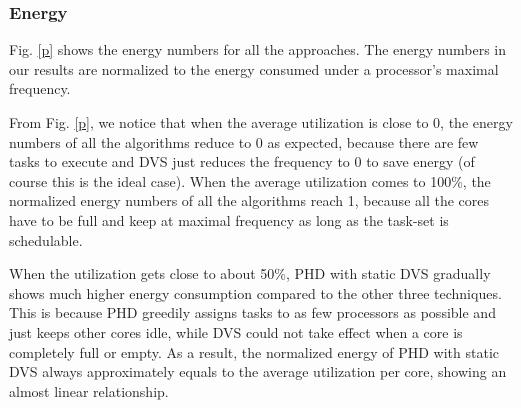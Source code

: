 \documentclass[12pt, journal,compsoc]{IEEEtran}
\begin{document}
\begin{figure*}[!t]
\centering
{}
\hspace{-0.2in}
\hspace{-0.2in}
\hspace{-0.2in}
\caption{Energy simulation results (under continuous voltages/frequencies).}
\label{p}
\end{figure*}

\begin{figure*}[!t]
\centering
{}
\hspace{-0.2in}
\hspace{-0.2in}
\hspace{-0.2in}
\caption{Energy simulation results (under discrete voltages/frequencies).}
\label{dp}
\end{figure*}


\subsubsection{Energy}

Fig. \ref{p} shows the energy numbers for all the approaches.
The energy numbers in our results are normalized to the energy consumed under a processor's maximal frequency.

From Fig. \ref{p}, we notice that when the average utilization is close to 0, the energy numbers of all the algorithms reduce to 0 as expected, because there are few tasks to execute and DVS just reduces the frequency to 0 to save energy (of course this is the ideal case). When the average utilization comes to 100\%, the normalized energy numbers of all the algorithms reach 1, because all the cores have to be full and keep at maximal frequency as long as the task-set is schedulable.

When the utilization gets close to about 50\%, PHD with static DVS gradually shows much higher energy consumption compared to the other three techniques. This is because PHD greedily assigns tasks to as few processors as possible and just keeps other cores idle, while DVS could not take effect when a core is completely full or empty. As a result, the normalized energy of PHD with static DVS always approximately equals to the average utilization per core, showing an almost linear relationship.
\end{document}

